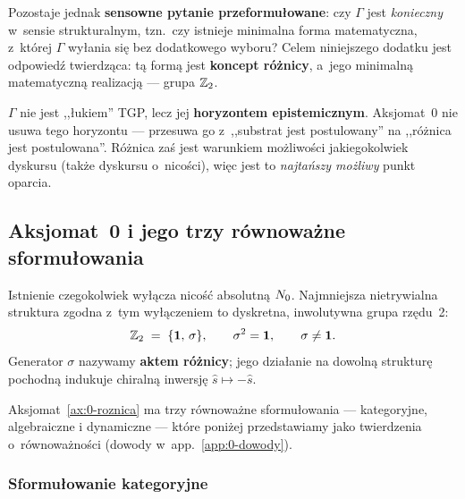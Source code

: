 Pozostaje jednak \textbf{sensowne pytanie przeformu\l{}owane}: czy
$\Gamma$ jest \emph{konieczny} w~sensie strukturalnym, tzn.~czy
istnieje minimalna forma matematyczna, z~kt\'orej $\Gamma$ wy\l{}ania
si\k{e} bez dodatkowego wyboru? Celem niniejszego dodatku jest
odpowied\'z twierdz\k{a}ca: t\k{a} form\k{a} jest \textbf{koncept
r\'o\.znicy}, a~jego minimaln\k{a} matematyczn\k{a} realizacj\k{a}
--- grupa $\mathbb{Z}_2$.

\begin{remark}
\label{rem:0-horyzont}
$\Gamma$ nie jest ,,\l{}ukiem'' TGP, lecz jej \textbf{horyzontem
epistemicznym}. Aksjomat~0 nie usuwa tego horyzontu --- przesuwa go
z~,,substrat jest postulowany'' na ,,r\'o\.znica jest postulowana''.
R\'o\.znica zaś jest warunkiem mo\.zliwo\'sci jakiegokolwiek
dyskursu (tak\.ze dyskursu o~nicości), wi\k{e}c jest to
\emph{najtańszy mo\.zliwy} punkt oparcia.
\end{remark}

\subsection{Aksjomat~0 i jego trzy r\'ownowa\.zne sformu\l{}owania}%
\label{app:0-aksjomat}

\begin{axiom}\label{ax:0-roznica}
Istnienie czegokolwiek wy\l{}\k{a}cza nicość absolutn\k{a} $N_0$.
Najmniejsza nietrywialna struktura zgodna z~tym wy\l{}\k{a}czeniem
to dyskretna, inwolutywna grupa rz\k{e}du~2:
\[
  \mathbb{Z}_2 \;=\; \{\mathbf{1},\,\sigma\},
  \qquad \sigma^2 = \mathbf{1},
  \qquad \sigma \neq \mathbf{1}.
\]
Generator $\sigma$ nazywamy \textbf{aktem r\'o\.znicy}; jego
dzia\l{}anie na dowoln\k{a} struktur\k{e} pochodn\k{a} indukuje
chiraln\k{a} inwersj\k{e} $\hat{s} \mapsto -\hat{s}$.
\end{axiom}

Aksjomat~\ref{ax:0-roznica} ma trzy r\'ownowa\.zne sformu\l{}owania
--- kategoryjne, algebraiczne i dynamiczne --- kt\'ore poni\.zej
przedstawiamy jako twierdzenia o~r\'ownowa\.zności (dowody w~app.~\ref{app:0-dowody}).

\subsubsection{Sformu\l{}owanie kategoryjne}%
\label{app:0-kategoryjne}

